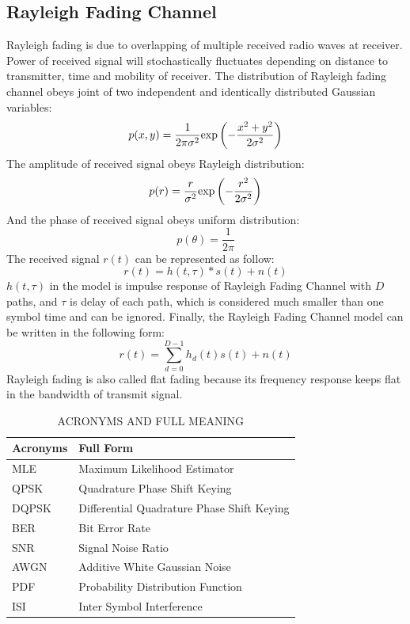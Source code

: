 \documentclass[technicalreport]{ieicej}
\begin{document}
\subsection{Rayleigh Fading Channel}
Rayleigh fading is due to overlapping of multiple received radio waves at receiver. Power of received signal will stochastically fluctuates depending on distance to transmitter, time and mobility of receiver. The distribution of Rayleigh fading channel obeys joint of two independent and identically distributed Gaussian variables\cite{wireless_com}:
\begin{equation}
p(x,y)=\frac{1}{2\pi\sigma^2}{\rm exp}\left(-\frac{x^2+y^2}{2\sigma^2}\right)
\end{equation}
The amplitude of received signal obeys Rayleigh distribution:
\begin{equation}
p(r)=\frac{r}{\sigma^2}{\rm exp}\left(-\frac{r^2}{2\sigma^2}\right)
\end{equation}
And the phase of received signal obeys uniform distribution:
\begin{equation}
p(\theta)=\frac{1}{2\pi}
\end{equation}
The received signal $r(t)$ can be represented as follow:
\begin{equation}
r(t)=h(t,\tau)*s(t)+n(t)
\end{equation}
$h(t,\tau)$ in the model is impulse response of Rayleigh Fading Channel with $D$ paths, and $\tau$ is delay of each path, which is considered much smaller than one symbol time and can be ignored. Finally, the Rayleigh Fading Channel model can be written in the following form:
\begin{equation}
r(t)=\sum_{d=0}^{D-1}h_{d}(t)s(t)+n(t)
\end{equation}
Rayleigh fading is also called flat fading because its frequency response keeps flat in the bandwidth of transmit signal.
\begin{table}[H]
	\begin{center}
	\caption{ACRONYMS AND FULL MEANING}
	\begin{tabular}{|l|l|}
	\hline
	\textbf{Acronyms} & \textbf{Full Form} \\
	\hline
	 MLE & Maximum Likelihood Estimator  \\ 
	 \hline
	 QPSK & Quadrature Phase Shift Keying  \\ 
	 \hline
	 DQPSK & Differential Quadrature Phase Shift Keying  \\
	 \hline
	 BER & Bit Error Rate \\
	 \hline
	 SNR & Signal Noise Ratio \\ 
	 \hline
	 AWGN & Additive White Gaussian Noise \\ 
	 \hline
	 PDF & Probability Distribution Function \\
	 \hline
	 ISI & Inter Symbol Interference \\
	 \hline
	\end{tabular}
	\end{center}
\end{table}
\end{document}
